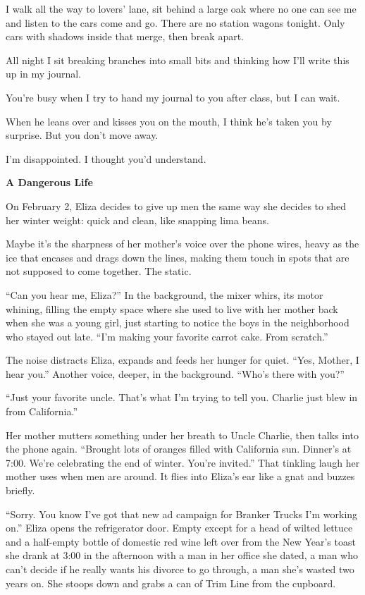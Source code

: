 \documentclass[
]{article}
\begin{document}
I walk all the way to lovers' lane, sit behind a large oak where no one
can see me and listen to the cars come and go. There are no station
wagons tonight. Only cars with shadows inside that merge, then break
apart.

All night I sit breaking branches into small bits and thinking how I'll
write this up in my journal.

You're busy when I try to hand my journal to you after class, but I can
wait.

When he leans over and kisses you on the mouth, I think he's taken you
by surprise. But you don't move away.

I'm disappointed. I thought you'd understand.

\textbf{\hfill\break
}

\textbf{A Dangerous Life}

On February 2, Eliza decides to give up men the same way she decides to
shed her winter weight: quick and clean, like snapping lima beans.

Maybe it's the sharpness of her mother's voice over the phone wires,
heavy as the ice that encases and drags down the lines, making them
touch in spots that are not supposed to come together. The static.

``Can you hear me, Eliza?'' In the background, the mixer whirs, its
motor whining, filling the empty space where she used to live with her
mother back when she was a young girl, just starting to notice the boys
in the neighborhood who stayed out late. ``I'm making your favorite
carrot cake. From scratch.''

The noise distracts Eliza, expands and feeds her hunger for quiet.
``Yes, Mother, I hear you.'' Another voice, deeper, in the background.
``Who's there with you?''

``Just your favorite uncle. That's what I'm trying to tell you. Charlie
just blew in from California.''

Her mother mutters something under her breath to Uncle Charlie, then
talks into the phone again. ``Brought lots of oranges filled with
California sun. Dinner's at 7:00. We're celebrating the end of winter.
You're invited.'' That tinkling laugh her mother uses when men are
around. It flies into Eliza's ear like a gnat and buzzes briefly.

``Sorry. You know I've got that new ad campaign for Branker Trucks I'm
working on.'' Eliza opens the refrigerator door. Empty except for a head
of wilted lettuce and a half-empty bottle of domestic red wine left over
from the New Year's toast she drank at 3:00 in the afternoon with a man
in her office she dated, a man who can't decide if he really wants his
divorce to go through, a man she's wasted two years on. She stoops down
and grabs a can of Trim Line from the cupboard.
\end{document}
